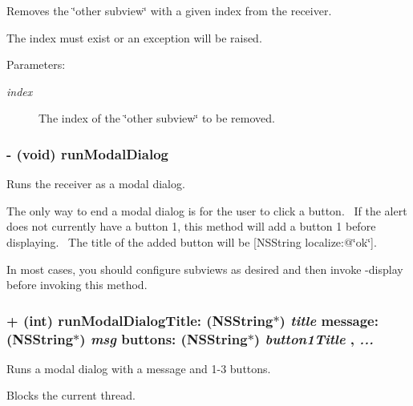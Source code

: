 Removes the \char`\"{}other subview\char`\"{} with a given index from the receiver. 

The index must exist or an exception will be raised. \begin{Desc}
\item[Parameters:]
\begin{description}
\item[{\em index}]The index of the \char`\"{}other subview\char`\"{} to be removed. \end{description}
\end{Desc}
\hypertarget{interface_s_s_y_alert_0306aca65c1fb2d524ac8a83151cd067}{
\subsubsection[{runModalDialog}]{\setlength{\rightskip}{0pt plus 5cm}- (void) runModalDialog }}
\label{interface_s_s_y_alert_0306aca65c1fb2d524ac8a83151cd067}


Runs the receiver as a modal dialog. 

The only way to end a modal dialog is for the user to click a button.~ If the alert does not currently have a button 1, this method will add a button 1 before displaying.~ The title of the added button will be \mbox{[}NSString localize:@\char`\"{}ok\char`\"{}\mbox{]}.

In most cases, you should configure subviews as desired and then invoke -display before invoking this method. \hypertarget{interface_s_s_y_alert_d39a91c4b93852513a2e0306a9c81041}{
\subsubsection[{runModalDialogTitle:message:buttons:}]{\setlength{\rightskip}{0pt plus 5cm}+ (int) runModalDialogTitle: (NSString$\ast$) {\em title}\/ message: (NSString$\ast$) {\em msg}\/ buttons: (NSString$\ast$) {\em button1Title}\/ ,  {\em ...}}}
\label{interface_s_s_y_alert_d39a91c4b93852513a2e0306a9c81041}


Runs a modal dialog with a message and 1-3 buttons. 

Blocks the current thread.

